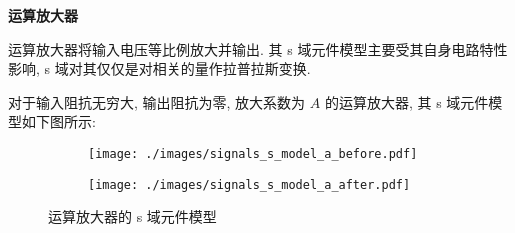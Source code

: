 \textbf{运算放大器}

运算放大器将输入电压等比例放大并输出. 其 s 域元件模型主要受其自身电路特性影响, s 域对其仅仅是对相关的量作拉普拉斯变换.

对于输入阻抗无穷大, 输出阻抗为零, 放大系数为 $A$ 的运算放大器, 其 s 域元件模型如下图所示:
\begin{figure}[H]
    \centering
    \begin{subfigure}{.419\textwidth}
        \centering
        \texttt{[image: ./images/signals\_s\_model\_a\_before.pdf]}
        \caption{}
    \end{subfigure}
    \begin{subfigure}{.481\textwidth}
        \centering
        \texttt{[image: ./images/signals\_s\_model\_a\_after.pdf]}
        \caption{}
    \end{subfigure}
    \caption{运算放大器的 s 域元件模型}
\end{figure}
